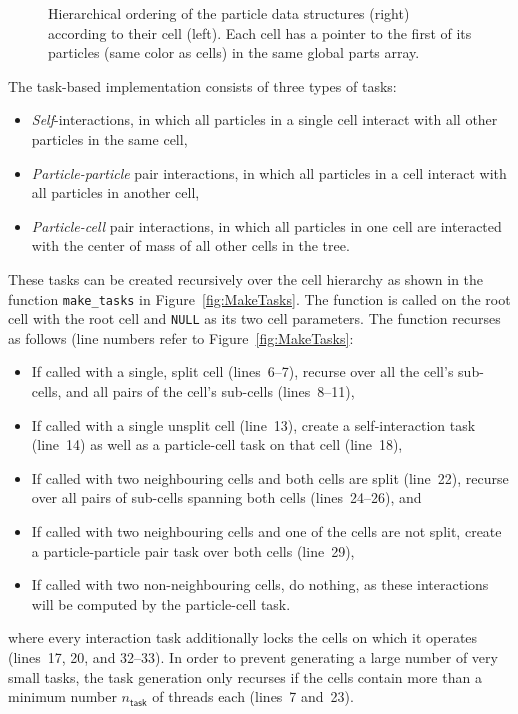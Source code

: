 \documentclass[fleqn,10pt]{wlpeerj}
\newcommand{\fig}[1]
    {Figure~\ref{fig:#1}}
\begin{document}
\begin{figure}
    \centerline{}
    \caption{Hierarchical ordering of the particle data structures
    (right) according to their cell (left).
    Each cell has a pointer to the first of its particles (same color
    as cells) in the same global parts array.}
    \label{fig:CellParts}
\end{figure}

The task-based implementation consists of three
types of tasks:
\begin{itemize}
    \item {\em Self}-interactions, in which all particles
        in a single cell interact with all other particles in the
        same cell,
    \item {\em Particle-particle} pair interactions, in which
        all particles in a cell interact with all
        particles in another cell,
    \item {\em Particle-cell} pair interactions, in which
        all particles in one cell are interacted with the
        center of mass of all other cells in the tree.
\end{itemize}

These tasks can be created recursively over the cell hierarchy
as shown in the function {\tt make\_tasks} in \fig{MakeTasks}.
The function is called on the root cell with the root cell
and {\tt NULL} as its two cell parameters.
The function recurses as follows (line numbers refer to \fig{MakeTasks}:
\begin{itemize}
    \item If called with a single, split cell (lines~6--7),
        recurse over all the cell's sub-cells, and all
        pairs of the cell's sub-cells (lines~8--11),
    \item If called with a single unsplit cell (line~13),
        create a self-interaction task (line~14) as well as a particle-cell
        task on that cell (line~18),
    \item If called with two neighbouring cells and both cells
        are split (line~22),
        recurse over all pairs of sub-cells spanning
        both cells (lines~24--26), and
    \item If called with two neighbouring cells
        and one of the cells are not split, create
        a particle-particle pair task over both cells (line~29),
    \item If called with two non-neighbouring cells,
        do nothing, as these interactions
        will be computed by the particle-cell task.
\end{itemize}
\noindent where every interaction task additionally locks
the cells on which it operates (lines~17, 20, and 32--33).
In order to prevent generating
a large number of very small tasks, the task generation only recurses
if the cells contain more than a minimum number $n_\mathsf{task}$
of threads each (lines~7 and~23).
\end{document}
